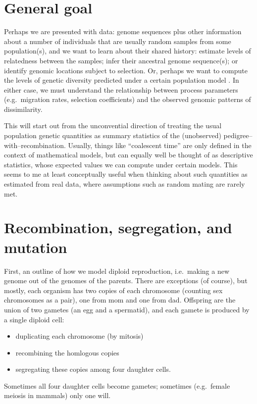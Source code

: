 

\section*{General goal}

Perhaps we are presented with data: genome sequences plus other information
about a number of individuals that are usually random samples from some population(s),
and we want to learn about their shared history: 
estimate levels of relatedness between the samples;
infer their ancestral genome sequence(s);
or identify genomic locations subject to selection.
Or, perhaps we want to compute the levels of genetic diversity 
predicted under a certain population model .
In either case, we must understand the relationship between process parameters
(e.g.\ migration rates, selection coefficients)
and the observed genomic patterns of dissimilarity.

This will start out from the unconvential direction
of treating the usual population genetic quantities as summary statistics
of the (unobserved) pedigree--with--recombination.
Usually, things like ``coalescent time'' are only defined in the context of mathematical models,
but can equally well be thought of as descriptive statistics,
whose expected values we can compute under certain models.
This seems to me at least conceptually useful when thinking about such quantities
as estimated from real data, where assumptions such as random mating are rarely met.


\section{Recombination, segregation, and mutation}

First, an outline of how we model diploid reproduction, i.e.\ making a new genome out of the genomes of the parents.
There are exceptions (of course), but mostly,
each organism has two copies of each chromosome (counting sex chromosomes as a pair), one from mom and one from dad.
Offspring are the union of two gametes (an egg and a spermatid),
and each gamete is produced by a single diploid cell:
\begin{itemize}
    \item duplicating each chromosome (by mitosis)
    \item recombining the homlogous copies
    \item segregating these copies among four daughter cells.
\end{itemize}
Sometimes all four daughter cells become gametes;
sometimes (e.g.\ female meiosis in mammals) only one will.


